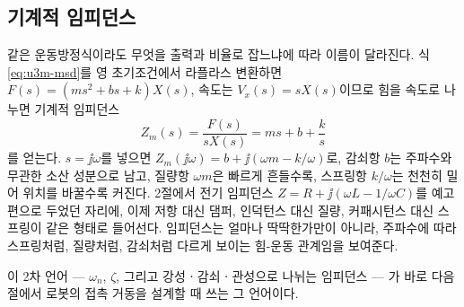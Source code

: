 \subsection{기계적 임피던스}

같은 운동방정식이라도 무엇을 출력과 비율로 잡느냐에 따라 이름이 달라진다.
식 \eqref{eq:u3m-msd}를 영 초기조건에서 라플라스 변환하면 $F(s)=(ms^2+bs+k)X(s)$,
속도는 $V_x(s)=sX(s)$이므로 힘을 속도로 나누면 기계적 임피던스
\begin{equation}
  Z_m(s)=\frac{F(s)}{sX(s)}=ms+b+\frac{k}{s}
  \label{eq:u3m-impedance}
\end{equation}
를 얻는다.
$s=\jj\omega$를 넣으면 $Z_m(\jj\omega)=b+\jj(\omega m-k/\omega)$로, 감쇠항 $b$는 주파수와
무관한 소산 성분으로 남고, 질량항 $\omega m$은 빠르게 흔들수록, 스프링항 $k/\omega$는
천천히 밀어 위치를 바꿀수록 커진다.
2절에서 전기 임피던스 $Z=R+\jj(\omega L-1/\omega C)$를 예고편으로 두었던 자리에, 이제
저항 대신 댐퍼, 인덕턴스 대신 질량, 커패시턴스 대신 스프링이 같은 형태로 들어선다.
임피던스는 얼마나 딱딱한가만이 아니라, 주파수에 따라 스프링처럼, 질량처럼, 감쇠처럼
다르게 보이는 힘-운동 관계임을 보여준다.

이 2차 언어 --- $\omega_n$, $\zeta$, 그리고 강성ㆍ감쇠ㆍ관성으로 나뉘는 임피던스 --- 가
바로 다음 절에서 로봇의 접촉 거동을 설계할 때 쓰는 그 언어이다.
